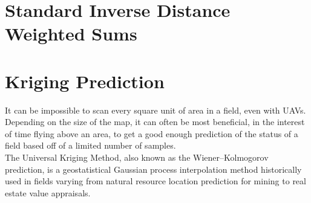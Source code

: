 \documentclass[11pt]{ucthesis}
\begin{document}
\section{Standard Inverse Distance Weighted Sums}

\section{Kriging Prediction}
It can be impossible to scan every square unit of area in a field, even with UAVs. Depending on the size of the map, it can often be most beneficial, in the interest of time flying above an area, to get a good enough prediction of the status of a field based off of a limited number of samples.\\
The Universal Kriging Method, also known as the Wiener–Kolmogorov prediction, is a geostatistical Gaussian process interpolation method historically used in fields varying from natural resource location prediction for mining to real estate value appraisals.\\
\end{document}
